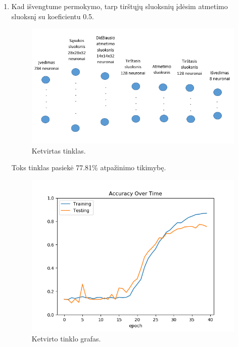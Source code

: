 \documentclass{VUMIFInfKursinis}
\begin{document}
\begin{enumerate}
    
    
    \newpage
    
    \item Kad išvengtume permokymo, tarp tirštųjų sluoksnių įdėsim atmetimo sluoksnį su koeficientu 0.5.
    
    
    \begin{figure}[h!]
    \centering
    \includegraphics[scale=0.8]{img/tinklas4}
    \caption{Ketvirtas tinklas.}
    \label{fig:tinklas4}
    \end{figure}
    
    
    Toks tinklas pasiekė 77.81\% atpažinimo tikimybę.
    
    
    \begin{figure}[h!]
    \centering
    \includegraphics[scale=0.6]{img/grafas4}
    \caption{Ketvirto tinklo grafas.}
    \label{fig:grafas4}
    \end{figure}
    

\end{enumerate}
\end{document}
